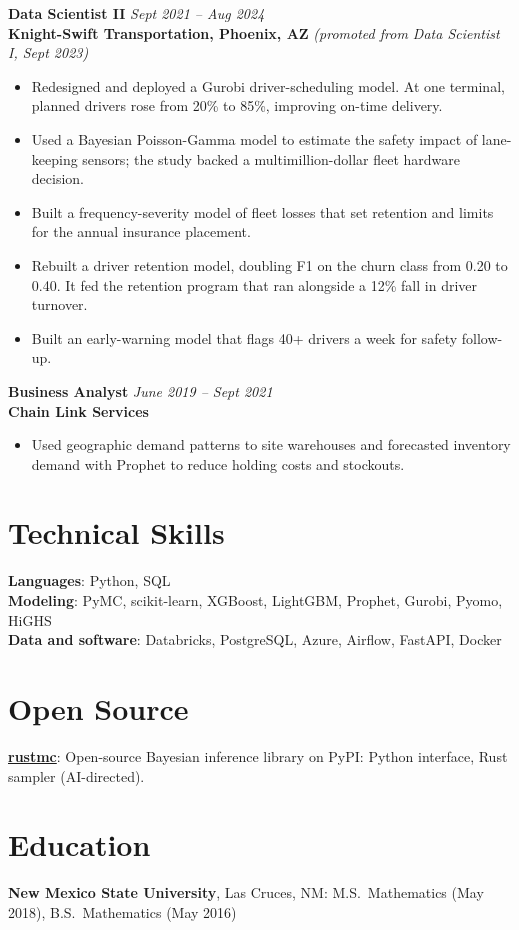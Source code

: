 \documentclass[10pt]{article}
\begin{document}
\textbf{Data Scientist II} \hfill \textit{Sept 2021 -- Aug 2024}\\
\textbf{Knight-Swift Transportation, Phoenix, AZ} \textit{(promoted from Data Scientist I, Sept 2023)}
\begin{itemize}[leftmargin=0.2in]
    \item Redesigned and deployed a Gurobi driver-scheduling model. At one terminal, planned drivers rose from 20\% to 85\%, improving on-time delivery.
    \item Used a Bayesian Poisson-Gamma model to estimate the safety impact of lane-keeping sensors; the study backed a multimillion-dollar fleet hardware decision.
    \item Built a frequency-severity model of fleet losses that set retention and limits for the annual insurance placement.
    \item Rebuilt a driver retention model, doubling F1 on the churn class from 0.20 to 0.40. It fed the retention program that ran alongside a 12\% fall in driver turnover.
    \item Built an early-warning model that flags 40+ drivers a week for safety follow-up.
\end{itemize}

\textbf{Business Analyst} \hfill \textit{June 2019 -- Sept 2021}\\
\textbf{Chain Link Services}
\begin{itemize}[leftmargin=0.2in]
    \item Used geographic demand patterns to site warehouses and forecasted inventory demand with Prophet to reduce holding costs and stockouts.
\end{itemize}

\section{Technical Skills}
\textbf{Languages}: Python, SQL \\
\textbf{Modeling}: PyMC, scikit-learn, XGBoost, LightGBM, Prophet, Gurobi, Pyomo, HiGHS \\
\textbf{Data and software}: Databricks, PostgreSQL, Azure, Airflow, FastAPI, Docker

\section{Open Source}
\textbf{\href{https://github.com/tbosier/rustmc}{rustmc}}: Open-source Bayesian inference library on PyPI: Python interface, Rust sampler (AI-directed).

\section{Education}
\textbf{New Mexico State University}, Las Cruces, NM: M.S.\ Mathematics (May 2018), B.S.\ Mathematics (May 2016)
\end{document}
